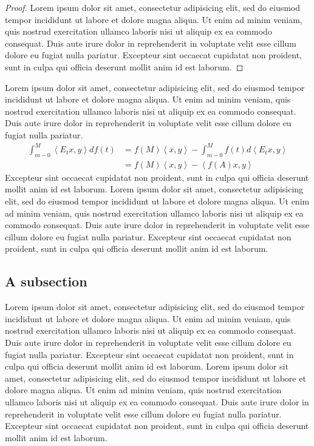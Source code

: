 \documentclass{article}
\begin{document}
\begin{proof}
Lorem ipsum dolor sit amet, consectetur adipisicing elit, sed do eiusmod tempor incididunt ut labore et dolore magna aliqua. Ut enim ad minim veniam, quis nostrud exercitation ullamco laboris nisi ut aliquip ex ea commodo consequat. Duis aute irure dolor in reprehenderit in voluptate velit esse cillum dolore eu fugiat nulla pariatur. Excepteur sint occaecat cupidatat non proident, sunt in culpa qui officia deserunt mollit anim id est laborum.
\end{proof}

Lorem ipsum dolor sit amet, consectetur adipisicing elit, sed do eiusmod tempor incididunt ut labore et dolore magna aliqua. Ut enim ad minim veniam, quis nostrud exercitation ullamco laboris nisi ut aliquip ex ea commodo consequat. Duis aute irure dolor in reprehenderit in voluptate velit esse cillum dolore eu fugiat nulla pariatur. 
\begin{align*}
\int_{m-0}^{M}\left\langle E_{t}x,y\right\rangle df\left( t\right)
&=f\left( M\right) \left\langle x,y\right\rangle
-\int_{m-0}^{M}f\left(
t\right) d\left\langle E_{t}x,y\right\rangle \\
&=f\left( M\right) \left\langle x,y\right\rangle -\left\langle
f\left( A\right) x,y\right\rangle
\end{align*}
Excepteur sint occaecat cupidatat non proident, sunt in culpa qui officia deserunt mollit anim id est laborum. Lorem ipsum dolor sit amet, consectetur adipisicing elit, sed do eiusmod tempor incididunt ut labore et dolore magna aliqua. Ut enim ad minim veniam, quis nostrud exercitation ullamco laboris nisi ut aliquip ex ea commodo consequat. Duis aute irure dolor in reprehenderit in voluptate velit esse cillum dolore eu fugiat nulla pariatur. Excepteur sint occaecat cupidatat non proident, sunt in culpa qui officia deserunt mollit anim id est laborum.

\subsection{A subsection}

Lorem ipsum dolor sit amet, consectetur adipisicing elit, sed do eiusmod tempor incididunt ut labore et dolore magna aliqua. Ut enim ad minim veniam, quis nostrud exercitation ullamco laboris nisi ut aliquip ex ea commodo consequat. Duis aute irure dolor in reprehenderit in voluptate velit esse cillum dolore eu fugiat nulla pariatur. Excepteur sint occaecat cupidatat non proident, sunt in culpa qui officia deserunt mollit anim id est laborum. Lorem ipsum dolor sit amet, consectetur adipisicing elit, sed do eiusmod tempor incididunt ut labore et dolore magna aliqua. Ut enim ad minim veniam, quis nostrud exercitation ullamco laboris nisi ut aliquip ex ea commodo consequat. Duis aute irure dolor in reprehenderit in voluptate velit esse cillum dolore eu fugiat nulla pariatur. Excepteur sint occaecat cupidatat non proident, sunt in culpa qui officia deserunt mollit anim id est laborum.
\end{document}
